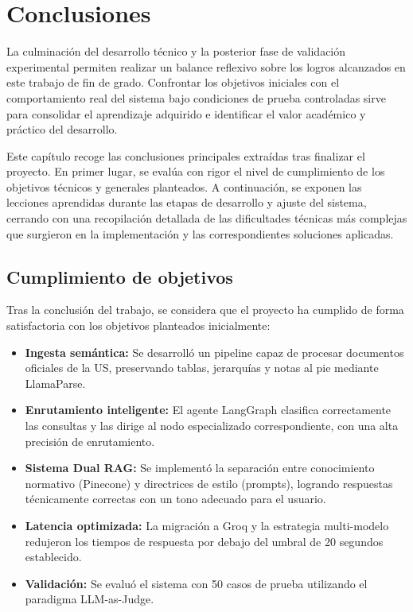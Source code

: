 \documentclass[12pt,a4paper,oneside]{report}
\begin{document}
\chapter{Conclusiones}

La culminación del desarrollo técnico y la posterior fase de validación experimental permiten realizar un balance reflexivo sobre los logros alcanzados en este trabajo de fin de grado. Confrontar los objetivos iniciales con el comportamiento real del sistema bajo condiciones de prueba controladas sirve para consolidar el aprendizaje adquirido e identificar el valor académico y práctico del desarrollo.

Este capítulo recoge las conclusiones principales extraídas tras finalizar el proyecto. En primer lugar, se evalúa con rigor el nivel de cumplimiento de los objetivos técnicos y generales planteados. A continuación, se exponen las lecciones aprendidas durante las etapas de desarrollo y ajuste del sistema, cerrando con una recopilación detallada de las dificultades técnicas más complejas que surgieron en la implementación y las correspondientes soluciones aplicadas.

\section{Cumplimiento de objetivos}

Tras la conclusión del trabajo, se considera que el proyecto ha cumplido de forma satisfactoria con los objetivos planteados inicialmente:

\begin{itemize}
    \item \textbf{Ingesta semántica:} Se desarrolló un pipeline capaz de procesar documentos oficiales de la US, preservando tablas, jerarquías y notas al pie mediante LlamaParse.
    \item \textbf{Enrutamiento inteligente:} El agente LangGraph clasifica correctamente las consultas y las dirige al nodo especializado correspondiente, con una alta precisión de enrutamiento.
    \item \textbf{Sistema Dual RAG:} Se implementó la separación entre conocimiento normativo (Pinecone) y directrices de estilo (prompts), logrando respuestas técnicamente correctas con un tono adecuado para el usuario.
    \item \textbf{Latencia optimizada:} La migración a Groq y la estrategia multi-modelo redujeron los tiempos de respuesta por debajo del umbral de 20 segundos establecido.
    \item \textbf{Validación:} Se evaluó el sistema con 50 casos de prueba utilizando el paradigma LLM-as-Judge.
\end{itemize}
\end{document}
